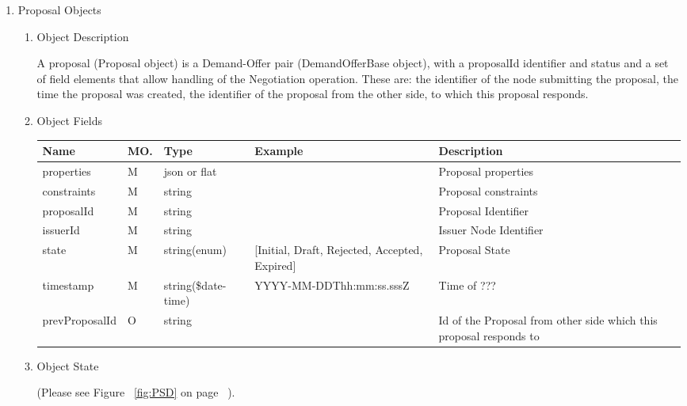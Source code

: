 \begin{enumerate}
\item Proposal Objects

\begin{enumerate}

\item Object Description

A proposal (Proposal object) is a Demand-Offer pair (DemandOfferBase object), with a proposalId identifier and status
and a set of field elements that allow handling of the Negotiation operation. These are: the identifier of the node submitting the proposal,
the time the proposal was created, the identifier of the proposal from the other side, to which this proposal responds.

\item Object Fields

\begin{center}
\begin{tabular}{|p{3cm}|l|p{3cm}|p{3cm}|p{4cm}|} 
\hline
\rowcolor{lightgray}	Name	& MO.	& Type	& Example & 	Description \\
\hline

properties		& M	& 	json or flat		&												&	Proposal properties \\ 
\hline

constraints		& M	& 	string				&												&	Proposal constraints \\ 
\hline

proposalId		& M & 	string  			& 												& 	Proposal Identifier \\
\hline

issuerId		& M & 	string				&												& 	Issuer Node Identifier 	\\ 
\hline

state			& M & 	string(enum) 		& [Initial, Draft, Rejected, Accepted, Expired]	&  Proposal State	\\
\hline

timestamp		& M	& 	string(\$date-time)	& YYYY-MM-DDThh:mm:ss.sssZ						&	Time of ???  \\
\hline

prevProposalId 	& O & 	string				&												& 	Id of the Proposal from other side which this proposal responds to \\
\hline

\end{tabular}
\end{center}

\item Object State

(Please see Figure ~\ref{fig:PSD} on page ~\pageref{fig:PSD}).


\end{enumerate}
\end{enumerate}
